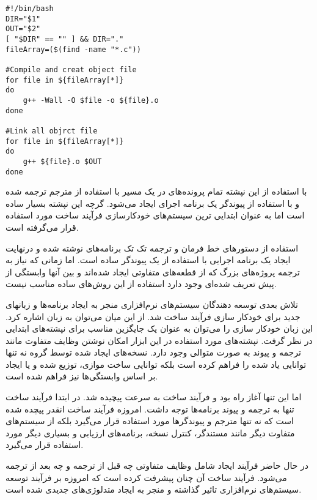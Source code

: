 \begin{latin}
\lstset{language=BASH}  
\begin{lstlisting}[frame=single] 
#!/bin/bash
DIR="$1"
OUT="$2"
[ "$DIR" == "" ] && DIR="."
fileArray=($(find -name "*.c"))

#Compile and creat object file
for file in ${fileArray[*]}
do
	g++ -Wall -O $file -o ${file}.o
done

#Link all objrct file
for file in ${fileArray[*]}
do
	g++ ${file}.o $OUT
done

\end{lstlisting}
\end{latin}

با استفاده از این نپشته تمام پرونده‌های  در یک مسیر با استفاده از مترجم
 ترجمه شده و با استفاده از پیوندگر یک برنامه اجرای
ایجاد می‌شود.
گرچه این نپشته بسیار ساده است اما به عنوان ابتدایی ترین سیستم‌های خودکارسازی
فرآیند ساخت مورد استفاده قرار می‌گرفته است.

استفاده از دستورهای خط فرمان و ترجمه تک تک برنامه‌های نوشته شده و درنهایت ایجاد
یک برنامه اجرایی با استفاده از یک پیوندگر ساده است. اما زمانی که نیاز به ترجمه
پروژه‌های بزرگ که از قطعه‌های متفاوتی ایجاد شده‌اند و بین آنها وابستگی از پیش
تعریف شده‌ای وجود دارد استفاده از این روش‌های ساده مناسب نیست.

تلاش بعدی توسعه دهندگان سیستم‌های نرم‌افزاری منجر به ایجاد برنامه‌ها و زبانهای
جدید برای خودکار سازی فرآیند ساخت شد. از این میان می‌توان به زبان 
اشاره کرد. این زبان خودکار سازی را می‌توان به عنوان یک جایگزین مناسب برای
نپشته‌های ابتدایی در نظر گرفت. نپشته‌های مورد استفاده در این ابزار امکان نوشتن
وظایف متفاوت مانند ترجمه و پیوند به صورت متوالی  وجود دارد. نسخه‌های ایجاد شده
توسط گروه  نه تنها توانایی یاد شده را فراهم کرده است بلکه توانایی ساخت
موازی، توزیع شده و یا ایجاد بر اساس وابستگی‌ها نیز فراهم شده است.

اما این تنها آغاز راه بود و فرآیند ساخت به سرعت پیچیده شد. در ابتدا فرآیند ساخت
تنها به ترجمه و پیوند برنامه‌ها توجه داشت. امروزه فرآیند ساخت انقدر پیچده شده
است که نه تنها مترجم‌ و پیوندگرها مورد استفاده قرار می‌گیرد بلکه از سیستم‌های
متفاوت دیگر مانند مستندگر، کنترل نسخه، برنامه‌های ارزیابی و بسیاری دیگر مورد
استفاده قرار می‌گیرد. 

در حال حاضر فرآیند ایجاد شامل وظایف متفاوتی چه قبل از ترجمه و چه بعد از ترجمه
می‌شود. فرآيند ساخت آن چنان پیشرفت کرده است که امروزه بر فرآیند توسعه سیستم‌های
نرم‌افزاری تاثیر گذاشته و منجر به ایجاد متدلوژی‌های جدیدی شده است.


